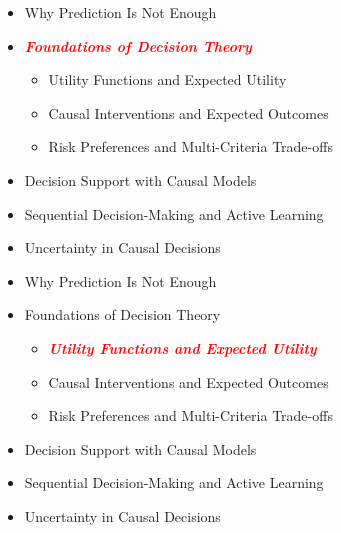 \documentclass[
  10pt,
  ignorenonframetext,
]{beamer}
\providecommand{\tightlist}{%
  \setlength{\itemsep}{0pt}\setlength{\parskip}{0pt}}
\begin{document}
\begin{frame}{}
\label{section-4}
\begin{itemize}
\tightlist
\item
  Why Prediction Is Not Enough
\item
  \emph{\textbf{\textcolor{red}{Foundations of Decision Theory}}}

  \begin{itemize}
  \tightlist
  \item
    Utility Functions and Expected Utility
  \item
    Causal Interventions and Expected Outcomes
  \item
    Risk Preferences and Multi-Criteria Trade-offs
  \end{itemize}
\item
  Decision Support with Causal Models
\item
  Sequential Decision-Making and Active Learning
\item
  Uncertainty in Causal Decisions
\end{itemize}
\end{frame}

\begin{frame}{}
\label{section-5}
\begin{itemize}
\tightlist
\item
  Why Prediction Is Not Enough
\item
  Foundations of Decision Theory

  \begin{itemize}
  \tightlist
  \item
    \emph{\textbf{\textcolor{red}{Utility Functions and Expected Utility}}}
  \item
    Causal Interventions and Expected Outcomes
  \item
    Risk Preferences and Multi-Criteria Trade-offs
  \end{itemize}
\item
  Decision Support with Causal Models
\item
  Sequential Decision-Making and Active Learning
\item
  Uncertainty in Causal Decisions
\end{itemize}
\end{frame}
\end{document}
